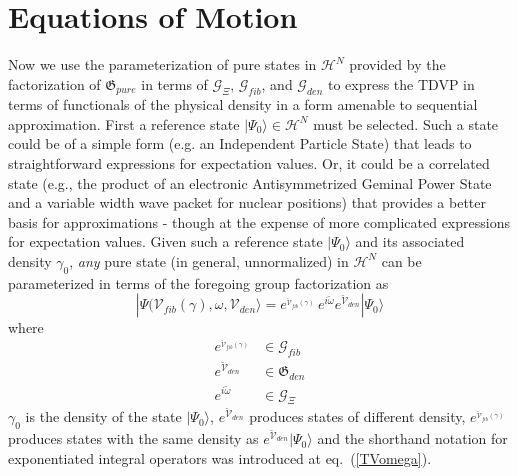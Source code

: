 \documentclass[aps,preprint]{revtex4}%
\begin{document}
\section{Equations of Motion}

Now we use the parameterization of pure states in $\mathcal{H}^{N}$ provided
by the factorization of $\mathfrak{G}_{pure}$ in terms of $\mathcal{G}_{\Xi}$,
$\mathcal{G}_{fib}$, and $\mathcal{G}_{den}$ to express the TDVP in terms of
functionals of the physical density in a form amenable to sequential
approximation. First a reference state $|\Psi_{0}\rangle\in\mathcal{H}^{N}$
must be selected. Such a state could be of a simple form (e.g. an Independent
Particle State) that leads to straightforward expressions for expectation
values. Or, it could be a correlated state (e.g., the product of an electronic
Antisymmetrized Geminal Power State \cite{Ortiz81} and a variable width wave
packet for nuclear positions) that provides a better basis for approximations
- though at the expense of more complicated expressions for expectation
values. Given such a reference state $|\Psi_{0}\rangle$ and its associated
density $\gamma_{0}$, \emph{any} pure state (in general, unnormalized) in
$\mathcal{H}^{N}$ can be parameterized in terms of the foregoing group
factorization as
\begin{equation}
|\Psi(\mathcal{V}_{fib}(\gamma),\omega,\mathcal{V}_{den}\rangle
=e^{_{\mathcal{\breve{V}}_{fib}(\gamma)}}\,e^{i\breve{\omega}}e^{\breve
{\mathcal{V}}_{den}}|\Psi_{0}\rangle\label{vv1omega1}%
\end{equation}
where
\begin{align}
e^{_{\mathcal{\breve{V}}_{fib}(\gamma)}}  &  \in\mathcal{G}_{fib}\nonumber\\
e^{\breve{\mathcal{V}}_{den}}  &  \in\mathfrak{G}_{den}\nonumber\\
e^{i\breve{\omega}}  &  \in\mathcal{G}_{\Xi} \label{vv1omega2}%
\end{align}
$\gamma_{0}$ is the density of the state $|\Psi_{0}\rangle$, $e^{\breve
{\mathcal{V}}_{den}}$ produces states of different density,
$e^{_{\mathcal{\breve{V}}_{fib}(\gamma)}}$ produces states with the same
density as $e^{\breve{\mathcal{V}}_{den}}|\Psi_{0}\rangle$ and the shorthand
notation for exponentiated integral operators was introduced at
eq.~(\ref{TVomega}).
\end{document}
